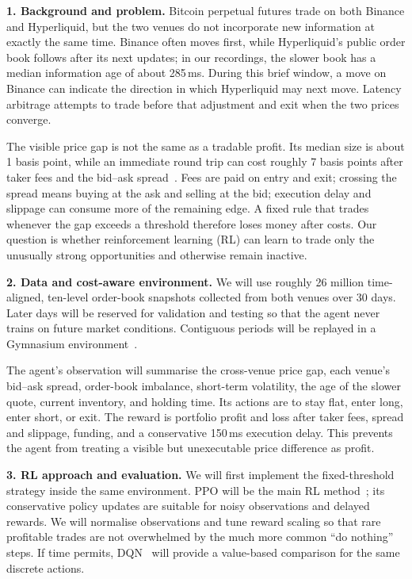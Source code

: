 \documentclass[10pt,a4paper]{article}
\begin{document}
\textbf{1. Background and problem.}
Bitcoin perpetual futures trade on both Binance and Hyperliquid, but the two venues do not
incorporate new information at exactly the same time. Binance often moves first, while
Hyperliquid's public order book follows after its next updates; in our recordings, the
slower book has a median information age of about 285\,ms. During this brief window, a move
on Binance can indicate the direction in which Hyperliquid may next move. Latency arbitrage
attempts to trade before that adjustment and exit when the two prices converge.

The visible price gap is not the same as a tradable profit. Its median size is about
1 basis point, while an immediate round trip can cost roughly 7 basis points after taker
fees and the bid--ask spread~\cite{report}. Fees are paid on entry and exit; crossing the
spread means buying at the ask and selling at the bid; execution delay and slippage can
consume more of the remaining edge. A fixed rule that trades whenever the gap exceeds a
threshold therefore loses money after costs. Our question is whether reinforcement
learning (RL) can learn to trade only the unusually strong opportunities and otherwise
remain inactive.

\textbf{2. Data and cost-aware environment.}
We will use roughly 26 million time-aligned, ten-level order-book snapshots collected from
both venues over 30 days. Later days will be reserved for validation and testing so that
the agent never trains on future market conditions. Contiguous periods will be replayed in
a Gymnasium environment~\cite{gym}.

The agent's observation will summarise the cross-venue price gap, each venue's bid--ask
spread, order-book imbalance, short-term volatility, the age of the slower quote, current
inventory, and holding time. Its actions are to stay flat, enter long, enter short, or exit.
The reward is portfolio profit and loss after taker fees, spread and slippage, funding, and
a conservative 150\,ms execution delay. This prevents the agent from treating a visible but
unexecutable price difference as profit.

\textbf{3. RL approach and evaluation.}
We will first implement the fixed-threshold strategy inside the same environment. PPO will
be the main RL method~\cite{ppo}; its conservative policy updates are suitable for noisy
observations and delayed rewards. We will normalise observations and tune reward scaling so
that rare profitable trades are not overwhelmed by the much more common ``do nothing''
steps. If time permits, DQN~\cite{dqn} will provide a value-based comparison for the same
discrete actions.
\end{document}
